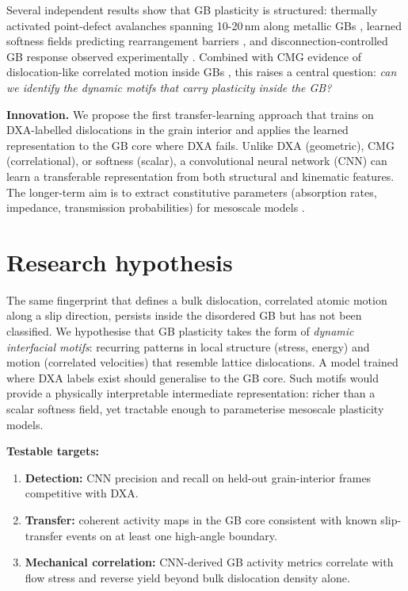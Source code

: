 \documentclass[11pt]{article}
\begin{document}
Several independent results show that GB plasticity is structured: thermally activated point-defect avalanches spanning 10-20\,nm along metallic GBs \cite{Chesser2022}, learned softness fields predicting rearrangement barriers \cite{Sharp2018}, and disconnection-controlled GB response observed experimentally \cite{Gautier2025}.
Combined with CMG evidence of dislocation-like correlated motion inside GBs \cite{Firman2024}, this raises a central question: \emph{can we identify the dynamic motifs that carry plasticity inside the GB?}

\textbf{Innovation.} We propose the first transfer-learning approach that trains on DXA-labelled dislocations in the grain interior and applies the learned representation to the GB core where DXA fails. Unlike DXA (geometric), CMG (correlational), or softness (scalar), a convolutional neural network (CNN) can learn a transferable representation from both structural and kinematic features. The longer-term aim is to extract constitutive parameters (absorption rates, impedance, transmission probabilities) for mesoscale models \cite{Bertin2024,Kedharnath2024,Piao2022,LeBauschinger2018}.

\section*{Research hypothesis}

The same fingerprint that defines a bulk dislocation, correlated atomic motion along a slip direction, persists inside the disordered GB but has not been classified.
We hypothesise that GB plasticity takes the form of \emph{dynamic interfacial motifs}: recurring patterns in local structure (stress, energy) and motion (correlated velocities) that resemble lattice dislocations. A model trained where DXA labels exist should generalise to the GB core.
Such motifs would provide a physically interpretable intermediate representation: richer than a scalar softness field, yet tractable enough to parameterise mesoscale plasticity models.

\textbf{Testable targets:}
\begin{enumerate}
    \item \textbf{Detection:} CNN precision and recall on held-out grain-interior frames competitive with DXA.
    \item \textbf{Transfer:} coherent activity maps in the GB core consistent with known slip-transfer events on at least one high-angle boundary.
    \item \textbf{Mechanical correlation:} CNN-derived GB activity metrics correlate with flow stress and reverse yield beyond bulk dislocation density alone.
\end{enumerate}
\end{document}
